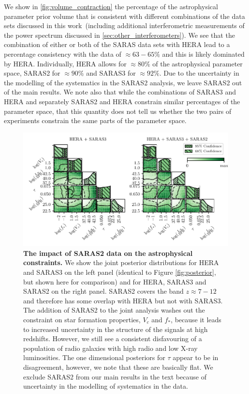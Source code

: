 We show in \cref{fig:volume_contraction} the percentage of the astrophysical parameter prior volume that is consistent with different combinations of the data sets discussed in this work~(including additional interferometric measurements of the power spectrum discussed in \cref{sec:other_interferometers}). We see that the combination of either or both of the SARAS data sets with HERA lead to a percentage consistency with the data of $\approx 63 - 65\%$ and this is likely dominated by HERA. Individually, HERA allows for $\approx 80\%$ of the astrophysical parameter space, SARAS2 for $\approx90\%$ and SARAS3 for $\approx92\%$. Due to the uncertainty in the modelling of the systematics in the SARAS2 analysis, we leave SARAS2 out of the main results. We note also that while the combinations of SARAS3 and HERA and separately SARAS2 and HERA constrain similar percentages of the parameter space, that this quantity does not tell us whether the two pairs of experiments constrain the same parts of the parameter space.

\begin{figure}
    \centering
    \includegraphics{joint_constraints/figs/other_global.pdf}
    \caption{\textbf{The impact of SARAS2 data on the astrophysical constraints.} We show the joint posterior distributions for HERA and SARAS3 on the left panel (identical to Figure \ref{fig:posterior}, but shown here for comparison) and for HERA, SARAS3 and SARAS2 on the right panel. SARAS2 covers the band $z\approx 7 - 12$ and therefore has some overlap with HERA but not with SARAS3. The addition of SARAS2 to the joint analysis washes out the constraint on star formation properties, $V_c$ and $f_*$, because it leads to increased uncertainty in the structure of the signals at high redshifts. However, we still see a consistent disfavouring of a population of radio galaxies with high radio and low X-ray luminosities. The one dimensional posteriors for $\tau$ appear to be in disagreement, however, we note that these are basically flat. We exclude SARAS2 from our main results in the text because of uncertainty in the modelling of systematics in the data.}
    \label{fig:other_global}
\end{figure}


